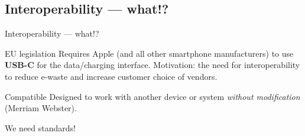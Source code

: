 \subsection{Interoperability — what!?}\label{subsec:USBc}
\begin{frame}{Interoperability — what!?}
  \begin{block}{EU legislation}
    \small Requires Apple (and all other smartphone manufacturers) to use \textbf{USB-C} for the data/charging interface.
    Motivation: the need for interoperability to reduce e-waste and increase customer choice of vendors.
  \end{block}

  \vspace{0.4cm}
  \begin{definition}{Compatible}
    \small Designed to work with another device or system \emph{without modification} (Merriam Webster).
  \end{definition}

  \vspace{0.4cm}
  \begin{center}
    {\LARGE\alert{We need standards!}}
  \end{center}
\end{frame}

